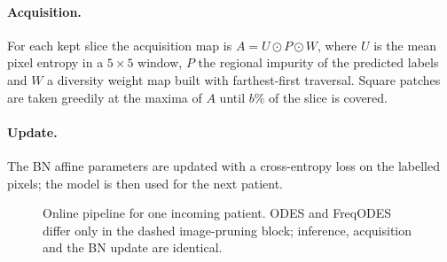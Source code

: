 \documentclass[a4paper,fleqn]{cas-dc}
\begin{document}
\paragraph{Acquisition.} For each kept slice the acquisition map is $A=U\odot P\odot W$, where $U$ is the mean pixel entropy in a $5\times5$ window, $P$ the regional impurity of the predicted labels~\cite{xie2022ripu} and $W$ a diversity weight map built with farthest-first traversal. Square patches are taken greedily at the maxima of $A$ until $b\%$ of the slice is covered.

\paragraph{Update.} The BN affine parameters are updated with a cross-entropy loss on the labelled pixels; the model is then used for the next patient.

\begin{figure}[!tp]
\centering
{}
\caption{Online pipeline for one incoming patient. ODES and FreqODES differ only in the dashed image-pruning block; inference, acquisition and the BN update are identical.}
\label{fig:arch}
\end{figure}
\end{document}
